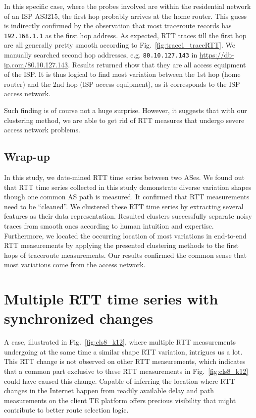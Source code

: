 In this specific case, where the probes involved are within the residential network of an ISP AS3215, the first hop probably arrives at the home router. This guess is indirectly confirmed by the observation that most traceroute records has \texttt{192.168.1.1} as the first hop address. As expected, RTT traces till the first hop are all generally pretty smooth according to Fig.~\ref{fig:trace1_traceRTT}. We manually searched second hop addresses, e.g. \texttt{80.10.127.143} in \url{https://db-ip.com/80.10.127.143}. Results returned show that they are all access equipment of the ISP.
It is thus logical to find most variation between the 1st hop (home router) and the 2nd hop (ISP access equipment), as it corresponds to the ISP access network.  

Such finding is of course not a huge surprise.%
However, it suggests that with our clustering method, we are able to get rid of RTT measures that undergo severe access network problems. 

\subsection*{Wrap-up}
In this study, we date-mined RTT time series between two ASes. 
We found out that RTT time series collected in this study demonstrate diverse variation shapes though one common AS path is measured.
It confirmed that RTT measurements need to be ``cleaned''.
We clustered these RTT time series by extracting %
several features as their data representation. 
Resulted clusters successfully separate noisy traces from smooth ones according to human intuition and expertise.
Furthermore, we located the occurring location of most variations in end-to-end RTT measurements by applying the presented clustering methods to the first hops of traceroute measurements.
Our results confirmed the common sense that most variations come from the access network.

\section{Multiple RTT time series with synchronized changes}
\label{sec:ripe_case_study}

A case, illustrated in Fig.~\ref{fig:cls8_k12}, where multiple RTT measurements undergoing at the same time a similar shape RTT variation, intrigues us a lot. This RTT change is not observed on other RTT measurements, which indicates that a common part exclusive to these RTT measurements in Fig.~\ref{fig:cls8_k12} could have caused this change.
Capable of inferring the location where RTT changes in the Internet happen from readily available delay and path measurements on the client TE platform offers precious visibility that might contribute to better route selection logic.

